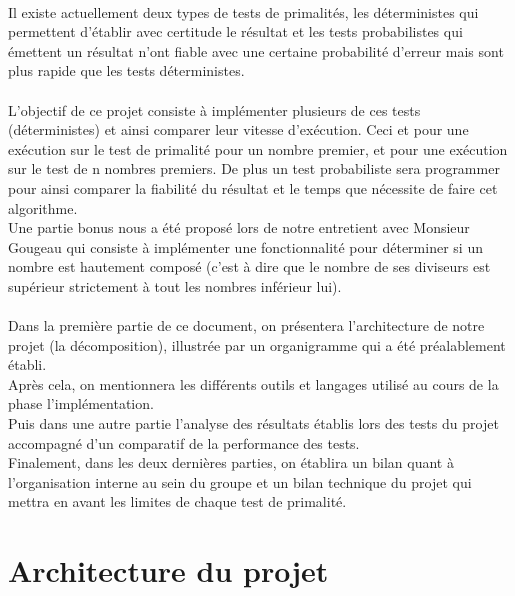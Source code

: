 	\paragraph{}Il existe actuellement deux types de tests de primalités, les déterministes qui permettent d'établir avec certitude le résultat et les tests probabilistes qui émettent un résultat n'ont fiable avec une certaine probabilité d'erreur mais sont plus rapide que les tests déterministes.
	
	\paragraph{}L'objectif de ce projet consiste à implémenter plusieurs de ces tests (déterministes) et ainsi comparer leur vitesse  d'exécution. Ceci et pour une exécution sur le test de primalité pour un nombre premier, et pour une exécution sur le test de n nombres premiers. De plus un test probabiliste sera programmer pour ainsi comparer la fiabilité du résultat et le temps que nécessite de faire cet algorithme.\\ 
	Une partie bonus nous a été proposé lors de notre entretient avec Monsieur Gougeau qui consiste à implémenter une fonctionnalité pour déterminer si un nombre est hautement composé (c'est à dire que le nombre de ses diviseurs est supérieur strictement à tout les nombres inférieur lui). 
	
	\paragraph{}Dans la première partie de ce document, on présentera l'architecture de notre projet (la décomposition), illustrée par un organigramme qui a été préalablement établi.\\
	Après cela, on mentionnera les différents outils et langages utilisé au cours de la phase l'implémentation.\\
	Puis dans une autre partie l'analyse des résultats établis lors des tests du projet accompagné d'un comparatif de la performance des tests.\\
	Finalement, dans les deux dernières parties, on établira un bilan quant à l'organisation interne au sein du groupe et un bilan technique du projet qui mettra en avant les limites de chaque test de primalité.
	
		
	\section{Architecture du projet}
